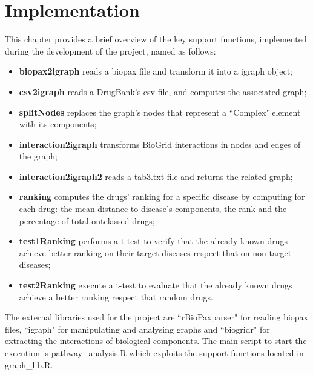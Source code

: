 \chapter{Implementation}
This chapter provides a brief overview of the key support functions, implemented  during the development of the project, named as follows:

\begin{itemize}
    \item \textbf{biopax2igraph} reads a biopax file and transform it into a igraph object;
    \item \textbf{csv2igraph} reads a DrugBank's csv file, and computes the associated graph;
    \item \textbf{splitNodes} replaces the graph's nodes that represent a ``Complex" element with its components;
    \item \textbf{interaction2igraph} transforms BioGrid\cite{biogrid} interactions in nodes and edges of the graph;
    \item \textbf{interaction2igraph2} reads a tab3.txt file and returns the related graph;
    \item \textbf{ranking} computes the drugs' ranking for a specific disease by computing for each drug: the mean distance to disease's components, the rank and the percentage of total outclassed drugs;
    \item \textbf{test1Ranking} performs a t-test to verify that the already known drugs achieve better ranking on their target diseases respect that on non target diseases;
    \item \textbf{test2Ranking} execute a t-test to evaluate that the already known drugs achieve a better ranking respect that random drugs.
\end{itemize}

The external libraries used for the project are ``rBioPaxparser" for reading biopax files, ``igraph" for manipulating and analysing graphs and ``biogridr" for extracting the interactions of biological components. The main script to start the execution is pathway\_analysis.R which exploits the support functions located in graph\_lib.R.